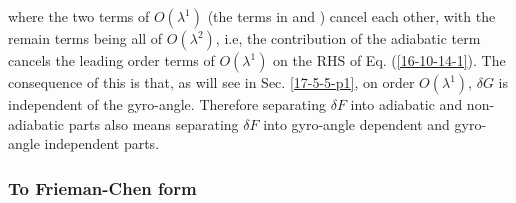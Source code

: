 \documentclass{article}
\newcommand{\tmcolor}[2]{{\color{#1}{#2}}}
\begin{document}
where the two terms of $O (\lambda^1)$ (the terms in \tmcolor{blue}{blue} and
\tmcolor{red}{red}) cancel each other, with the remain terms being all of $O
(\lambda^2)$, i.e, the contribution of the adiabatic term cancels the leading
order terms of $O (\lambda^1)$ on the RHS of Eq. (\ref{16-10-14-1}). The
consequence of this is that, as will see in Sec. \ref{17-5-5-p1}, on order $O
(\lambda^1)$, $\delta G$ is independent of the gyro-angle. Therefore
separating $\delta F$ into adiabatic and non-adiabatic parts also means
separating $\delta F$ into gyro-angle dependent and gyro-angle independent
parts.

\subsubsection{To Frieman-Chen form}
\end{document}
